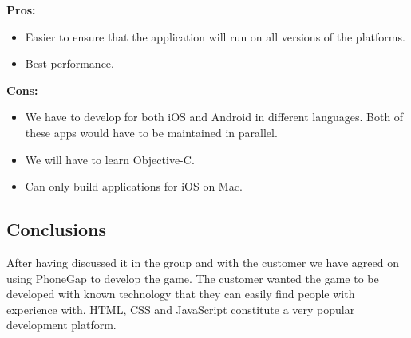 \indent
  {\bf Pros:}
  \begin{itemize}
    \item Easier to ensure that the application will run on all versions of
          the platforms.
    \item Best performance.
  \end{itemize}

\indent
  {\bf Cons:}
  \begin{itemize}
    \item We have to develop for both iOS and Android in different languages.
          Both of these apps would have to be maintained in parallel.
    \item We will have to learn Objective-C.
    \item Can only build applications for iOS on Mac.
  \end{itemize}

\noindent
\subsection{Conclusions}
    After having discussed it in the group and with the customer we have agreed
    on using PhoneGap to develop the game. The customer wanted the game to
    be developed with known technology that they can easily find people with
    experience with. HTML, CSS and JavaScript constitute a very popular development
    platform.

